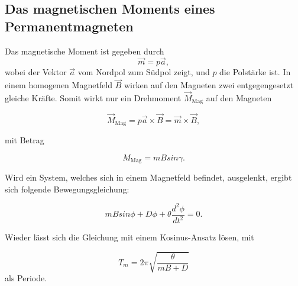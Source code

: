 \subsection{Das magnetischen Moments eines Permanentmagneten}
Das magnetische Moment ist gegeben durch
\begin{equation}
  \vec{m} = p \vec{a} ,
\end{equation}
wobei der Vektor $\vec{a}$ vom Nordpol zum Südpol zeigt, und $p$ die Polstärke ist.
In einem homogenen Magnetfeld $\vec{B}$ wirken auf den Magneten zwei entgegengesetzt gleiche Kräfte. Somit wirkt nur ein Drehmoment $\vec{M}_\text{Mag}$
auf den Magneten

\begin{equation}
  \vec{M}_\text{Mag} = p \vec{a} \times \vec{B} = \vec{m} \times \vec{B} ,
\end{equation}

mit Betrag

\begin{equation}
 M_\text{Mag} = m B sin\gamma .
\end{equation}

Wird ein System, welches sich in einem Magnetfeld befindet, ausgelenkt, ergibt sich folgende Bewegungsgleichung:

\begin{equation}
  m B sin\phi + D \phi + \theta \frac{d^{2}\phi}{dt^{2}} = 0 .
\end{equation}

Wieder lässt sich die Gleichung mit einem Kosinus-Ansatz lösen, mit

\begin{equation}
  T_m = 2\pi \sqrt{\frac{\theta}{m B + D}}
\end{equation}
als Periode.



